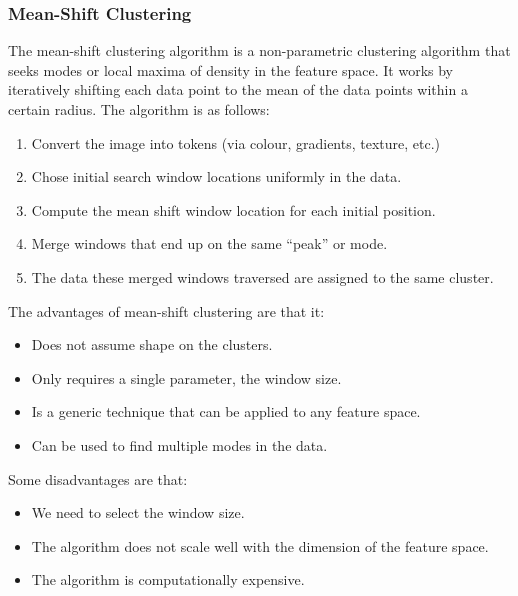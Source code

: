 \documentclass{article}
\begin{document}
\subsubsection{Mean-Shift Clustering}
The mean-shift clustering algorithm is a non-parametric clustering
algorithm that seeks modes or local maxima of density in the feature
space. It works by iteratively shifting each data point to the mean of
the data points within a certain radius. The algorithm is as follows:
\begin{enumerate}
    \item Convert the image into tokens (via colour, gradients,
          texture, etc.)
    \item Chose initial search window locations uniformly in the data.
    \item Compute the mean shift window location for each initial
          position.
    \item Merge windows that end up on the same ``peak'' or mode.
    \item The data these merged windows traversed are assigned to the
          same cluster.
\end{enumerate}
The advantages of mean-shift clustering are that it:
\begin{itemize}
    \item Does not assume shape on the clusters.
    \item Only requires a single parameter, the window size.
    \item Is a generic technique that can be applied to any feature
          space.
    \item Can be used to find multiple modes in the data.
\end{itemize}
Some disadvantages are that:
\begin{itemize}
    \item We need to select the window size.
    \item The algorithm does not scale well with the dimension of the
          feature space.
    \item The algorithm is computationally expensive.
\end{itemize}
\end{document}
